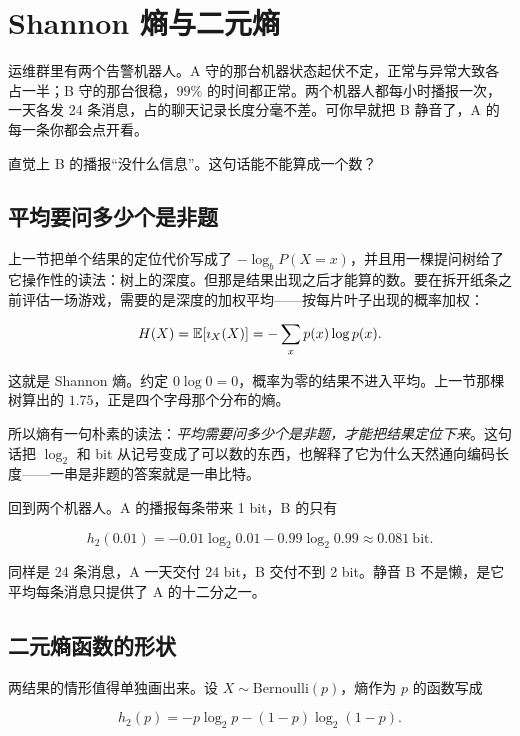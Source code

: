 \section{Shannon 熵与二元熵}
\label{sec:07-Information-Theory/01-Information-and-Entropy/02}

运维群里有两个告警机器人。A 守的那台机器状态起伏不定，正常与异常大致各占一半；B 守的那台很稳，\(99\%\) 的时间都正常。两个机器人都每小时播报一次，一天各发 24 条消息，占的聊天记录长度分毫不差。可你早就把 B 静音了，A 的每一条你都会点开看。

直觉上 B 的播报``没什么信息''。这句话能不能算成一个数？

\subsection{平均要问多少个是非题}

上一节把单个结果的定位代价写成了 \(-\log_b P(X=x)\)，并且用一棵提问树给了它操作性的读法：树上的深度。但那是结果出现之后才能算的数。要在拆开纸条之前评估一场游戏，需要的是深度的加权平均——按每片叶子出现的概率加权：

\[
H(X)=\mathbb{E}[\imath_X(X)]=-\sum_x p(x)\log p(x).
\]

这就是 Shannon 熵。约定 \(0\log 0=0\)，概率为零的结果不进入平均。上一节那棵树算出的 \(1.75\)，正是四个字母那个分布的熵。

所以熵有一句朴素的读法：\emph{平均需要问多少个是非题，才能把结果定位下来}。这句话把 \(\log_2\) 和 bit 从记号变成了可以数的东西，也解释了它为什么天然通向编码长度——一串是非题的答案就是一串比特。

回到两个机器人。A 的播报每条带来 1 bit，B 的只有

\[
h_2(0.01)=-0.01\log_2 0.01-0.99\log_2 0.99\approx 0.081\ \text{bit}.
\]

同样是 24 条消息，A 一天交付 24 bit，B 交付不到 2 bit。静音 B 不是懒，是它平均每条消息只提供了 A 的十二分之一。

\subsection{二元熵函数的形状}

两结果的情形值得单独画出来。设 \(X\sim\mathrm{Bernoulli}(p)\)，熵作为 \(p\) 的函数写成

\[
h_2(p)=-p\log_2 p-(1-p)\log_2(1-p).
\]

